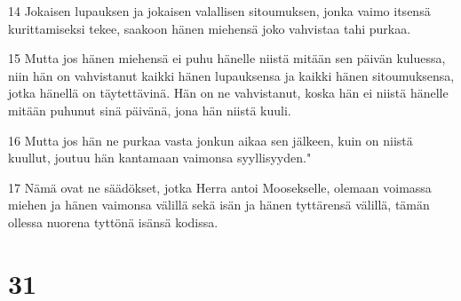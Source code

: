 \par 14 Jokaisen lupauksen ja jokaisen valallisen sitoumuksen, jonka vaimo itsensä kurittamiseksi tekee, saakoon hänen miehensä joko vahvistaa tahi purkaa.
\par 15 Mutta jos hänen miehensä ei puhu hänelle niistä mitään sen päivän kuluessa, niin hän on vahvistanut kaikki hänen lupauksensa ja kaikki hänen sitoumuksensa, jotka hänellä on täytettävinä. Hän on ne vahvistanut, koska hän ei niistä hänelle mitään puhunut sinä päivänä, jona hän niistä kuuli.
\par 16 Mutta jos hän ne purkaa vasta jonkun aikaa sen jälkeen, kuin on niistä kuullut, joutuu hän kantamaan vaimonsa syyllisyyden."
\par 17 Nämä ovat ne säädökset, jotka Herra antoi Moosekselle, olemaan voimassa miehen ja hänen vaimonsa välillä sekä isän ja hänen tyttärensä välillä, tämän ollessa nuorena tyttönä isänsä kodissa.

\chapter{31}

